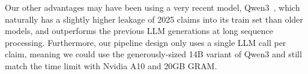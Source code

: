 Our other advantages may have been using a very recent model, Qwen3~\cite{yang2025qwen3technicalreport}, which naturally has a slightly higher leakage of 2025 claims into its train set than older models, and outperforms the previous LLM generations at long sequence processing. Furthermore, our pipeline design only uses a single LLM call per claim, meaning we could use the generously-sized 14B variant of Qwen3 and still match the time limit with Nvidia A10 and 20GB GRAM.